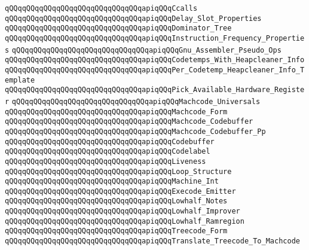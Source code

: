 \verb|qQQqqQQqqQQqqQQqqQQqqQQqqQQqqQQqapiqQQqCcalls|\newline
\verb|qQQqqQQqqQQqqQQqqQQqqQQqqQQqqQQqapiqQQqDelay_Slot_Properties|\newline
\verb|qQQqqQQqqQQqqQQqqQQqqQQqqQQqqQQqapiqQQqDominator_Tree|\newline
\verb|qQQqqQQqqQQqqQQqqQQqqQQqqQQqqQQqapiqQQqInstruction_Frequency_Properties|\newline
\verb|qQQqqQQqqQQqqQQqqQQqqQQqqQQqqQQqapiqQQqGnu_Assembler_Pseudo_Ops|\newline
\verb|qQQqqQQqqQQqqQQqqQQqqQQqqQQqqQQqapiqQQqCodetemps_With_Heapcleaner_Info|\newline
\verb|qQQqqQQqqQQqqQQqqQQqqQQqqQQqqQQqapiqQQqPer_Codetemp_Heapcleaner_Info_Template|\newline
\verb|qQQqqQQqqQQqqQQqqQQqqQQqqQQqqQQqapiqQQqPick_Available_Hardware_Register|\newline
\verb|qQQqqQQqqQQqqQQqqQQqqQQqqQQqqQQqapiqQQqMachcode_Universals|\newline
\verb|qQQqqQQqqQQqqQQqqQQqqQQqqQQqqQQqapiqQQqMachcode_Form|\newline
\verb|qQQqqQQqqQQqqQQqqQQqqQQqqQQqqQQqapiqQQqMachcode_Codebuffer|\newline
\verb|qQQqqQQqqQQqqQQqqQQqqQQqqQQqqQQqapiqQQqMachcode_Codebuffer_Pp|\newline
\verb|qQQqqQQqqQQqqQQqqQQqqQQqqQQqqQQqapiqQQqCodebuffer|\newline
\verb|qQQqqQQqqQQqqQQqqQQqqQQqqQQqqQQqapiqQQqCodelabel|\newline
\verb|qQQqqQQqqQQqqQQqqQQqqQQqqQQqqQQqapiqQQqLiveness|\newline
\verb|qQQqqQQqqQQqqQQqqQQqqQQqqQQqqQQqapiqQQqLoop_Structure|\newline
\verb|qQQqqQQqqQQqqQQqqQQqqQQqqQQqqQQqapiqQQqMachine_Int|\newline
\verb|qQQqqQQqqQQqqQQqqQQqqQQqqQQqqQQqapiqQQqExecode_Emitter|\newline
\verb|qQQqqQQqqQQqqQQqqQQqqQQqqQQqqQQqapiqQQqLowhalf_Notes|\newline
\verb|qQQqqQQqqQQqqQQqqQQqqQQqqQQqqQQqapiqQQqLowhalf_Improver|\newline
\verb|qQQqqQQqqQQqqQQqqQQqqQQqqQQqqQQqapiqQQqLowhalf_Ramregion|\newline
\verb|qQQqqQQqqQQqqQQqqQQqqQQqqQQqqQQqapiqQQqTreecode_Form|\newline
\verb|qQQqqQQqqQQqqQQqqQQqqQQqqQQqqQQqapiqQQqTranslate_Treecode_To_Machcode|\newline
